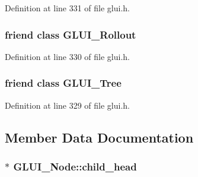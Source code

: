 Definition at line 331 of file glui.\+h.

\hypertarget{class_g_l_u_i___node_a342e7f489f8666a8156fb18bd0ea0d2e}{
\subsubsection[{G\+L\+U\+I\+\_\+\+Rollout}]{\setlength{\rightskip}{0pt plus 5cm}friend class {\bf G\+L\+U\+I\+\_\+\+Rollout}\hspace{0.3cm}{\ttfamily [friend]}}}\label{class_g_l_u_i___node_a342e7f489f8666a8156fb18bd0ea0d2e}


Definition at line 330 of file glui.\+h.

\hypertarget{class_g_l_u_i___node_a5cd4411266c4ef47da626d8efdf1138e}{
\subsubsection[{G\+L\+U\+I\+\_\+\+Tree}]{\setlength{\rightskip}{0pt plus 5cm}friend class {\bf G\+L\+U\+I\+\_\+\+Tree}\hspace{0.3cm}{\ttfamily [friend]}}}\label{class_g_l_u_i___node_a5cd4411266c4ef47da626d8efdf1138e}


Definition at line 329 of file glui.\+h.



\subsection{Member Data Documentation}
\hypertarget{class_g_l_u_i___node_ad9370e7f62e83bb720063d2439f544c2}{
\subsubsection[{child\+\_\+head}]{$\ast$ G\+L\+U\+I\+\_\+\+Node\+::child\+\_\+head\hspace{0.3cm}{\ttfamily [protected]}}}\label{class_g_l_u_i___node_ad9370e7f62e83bb720063d2439f544c2}


